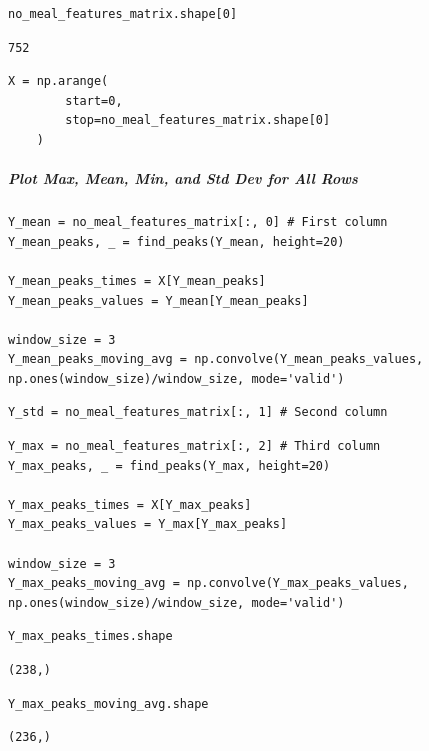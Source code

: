 \begin{verbatim}
no_meal_features_matrix.shape[0]
\end{verbatim}

\begin{verbatim}
752
\end{verbatim}

\begin{verbatim}
X = np.arange(
        start=0,
        stop=no_meal_features_matrix.shape[0]
    )
\end{verbatim}

\subparagraph{Plot Max, Mean, Min, and Std Dev for All Rows}

\begin{verbatim}
Y_mean = no_meal_features_matrix[:, 0] # First column
Y_mean_peaks, _ = find_peaks(Y_mean, height=20)

Y_mean_peaks_times = X[Y_mean_peaks]
Y_mean_peaks_values = Y_mean[Y_mean_peaks]

window_size = 3
Y_mean_peaks_moving_avg = np.convolve(Y_mean_peaks_values, np.ones(window_size)/window_size, mode='valid')
\end{verbatim}

\begin{verbatim}
Y_std = no_meal_features_matrix[:, 1] # Second column
\end{verbatim}

\begin{verbatim}
Y_max = no_meal_features_matrix[:, 2] # Third column
Y_max_peaks, _ = find_peaks(Y_max, height=20)

Y_max_peaks_times = X[Y_max_peaks]
Y_max_peaks_values = Y_max[Y_max_peaks]

window_size = 3
Y_max_peaks_moving_avg = np.convolve(Y_max_peaks_values, np.ones(window_size)/window_size, mode='valid')
\end{verbatim}

\begin{verbatim}
Y_max_peaks_times.shape
\end{verbatim}

\begin{verbatim}
(238,)
\end{verbatim}

\begin{verbatim}
Y_max_peaks_moving_avg.shape
\end{verbatim}

\begin{verbatim}
(236,)
\end{verbatim}

